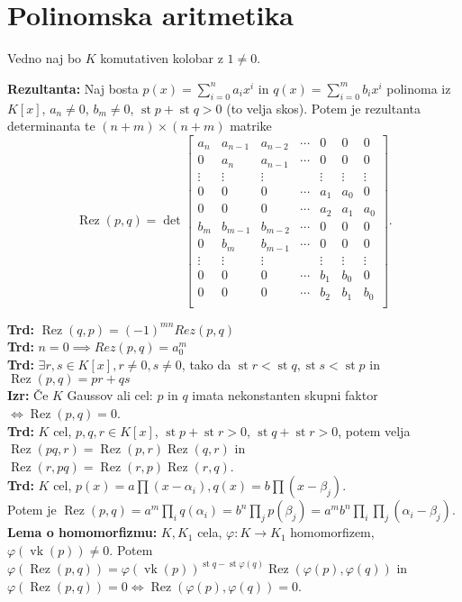 \documentclass[a4paper,oneside,10pt]{article}
\theoremstyle{definition}
\newcommand{\st}{\operatorname{st}}
\newcommand{\rez}{\operatorname{Rez}}
\newcommand{\vk}{\operatorname{vk}}
\let\oldtextbf\textbf
\renewcommand{\textbf}[1]{\oldtextbf{\boldmath #1}}
\begin{document}
\section*{Polinomska aritmetika}
Vedno naj bo $K$ komutativen kolobar z $1 \neq 0$.

\textbf{Rezultanta: } Naj bosta $p(x) = \sum_{i=0}^n a_ix^i$ in
$q(x) = \sum_{i=0}^m b_i x^i$ polinoma iz $K[x]$, $a_n \neq 0$, $b_m \neq 0$, $\st p + \st q > 0$ (to velja skos). Potem je rezultanta determinanta te $(n+m) \times (n+m)$ matrike
\[
\rez(p, q) = \det
\begin{bmatrix}
      a_n & a_{n-1} & a_{n-2} & \cdots & 0 & 0 & 0 \\
      0 & a_n & a_{n-1} & \cdots & 0 & 0 & 0 \\
      \vdots & \vdots & \vdots & & \vdots & \vdots & \vdots \\
      0 & 0 & 0 & \cdots & a_1 & a_0 & 0 \\
      0 & 0 & 0 & \cdots & a_2 & a_1 & a_0  \\
      b_m & b_{m-1} & b_{m-2} & \cdots & 0 & 0 & 0 \\
      0 & b_m & b_{m-1} &  \cdots & 0 & 0 & 0 \\
      \vdots & \vdots & \vdots & & \vdots & \vdots & \vdots \\
      0 & 0 & 0 & \cdots & b_1 & b_0 & 0 \\
      0 & 0 & 0 & \cdots & b_2 & b_1 & b_0  \\
\end{bmatrix}.
\]

\textbf{Trd:} $\rez(q, p) = (-1)^{mn} Rez(p, q)$ \\
\textbf{Trd:} $n = 0 \implies Rez(p, q) = a_0^m$ \\
\textbf{Trd:} $\exists r, s \in K[x], r \neq 0, s \neq 0$, tako da $\st r < \st q, \st s < \st p$ in $\rez(p, q) = pr + qs$ \\
\textbf{Izr:} Če $K$ Gaussov ali cel: $p$ in $q$ imata nekonstanten skupni faktor $\iff \rez(p, q) = 0$.  \\
\textbf{Trd:} $K$ cel, $p, q, r \in K[x]$, $\st p + \st r > 0$, $\st q + \st r > 0$, potem velja
$\rez(pq, r) = \rez(p, r)\rez(q, r)$ in $\rez(r, pq) = \rez(r, p)\rez(r, q)$.  \\
\textbf{Trd:} $K$ cel, $p(x) = a \prod(x-\alpha_i), q(x) = b \prod (x-\beta_j)$. \\ Potem je $\rez(p, q) = a^m \prod_i q(\alpha_i) = b^n \prod_j p(\beta_j) = a^mb^n \prod_i \prod_j (\alpha_i - \beta_j)$.\\
\textbf{Lema o homomorfizmu:} $K, K_1$ cela, $\varphi\colon K \to K_1$ homomorfizem, $\varphi(\vk(p)) \neq 0$. Potem $\varphi(\rez(p, q)) = \varphi(\vk(p))^{\st q - \st \varphi (q)} \rez(\varphi(p), \varphi(q))$ in $\varphi(\rez(p, q)) = 0 \iff \rez(\varphi(p), \varphi(q)) = 0$.
\end{document}
